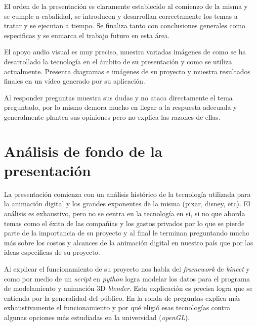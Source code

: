 \documentclass[spanish, fleqn]{article}
\let\e\emph
\begin{document}
    El orden de la presentación es claramente establecido al comienzo de la
    misma y se cumple a cabalidad, se introducen y desarrollan correctamente los
    temas a tratar y se ejecutan a tiempo. Se finaliza tanto con conclusiones
    generales como especificas y se enmarca el trabajo futuro en esta área.

    El apoyo audio visual es muy preciso, muestra variadas imágenes de como se
    ha desarrollado la tecnología en el ámbito de su presentación y como se
    utiliza actualmente. Presenta diagramas e imágenes de su proyecto y muestra
    resultados finales en un vídeo generado por su aplicación.

    Al responder preguntas muestra sus dudas y no ataca directamente el tema
    preguntado, por lo mismo demora mucho en llegar a la respuesta adecuada y
    generalmente plantea sus opiniones pero no explica las razones de ellas.

\section{Análisis de fondo de la presentación}
    La presentación comienza con un análisis histórico de la tecnología
    utilizada para la animación digital y los grandes exponentes de la misma
    (pixar, disney, etc). El análisis es exhaustivo, pero no se centra en la
    tecnología en sí, si no que aborda temas como el éxito de las compañías y 
    los gastos privados por lo que se pierde parte de la importancia de su
    proyecto y al final le terminan preguntando mucho más sobre los costos y
    alcances de la animación digital en nuestro país que por las ideas
    especificas de su proyecto.

    Al explicar el funcionamiento de su proyecto nos habla del \e{framework} de
    \e{kinect} y como por medio de un \e{script} en \e{python} logra modelar los
    datos para el programa de modelamiento y animación 3D \e{blender}. Esta
    explicación es precisa logra que se entienda por la generalidad del público.
    En la ronda de preguntas explica más exhaustivamente el funcionamiento y por
    qué eligió esas tecnologías contra algunas opciones más estudiadas en la
    universidad (\e{openGL}).

\newpage {}
\end{document}
